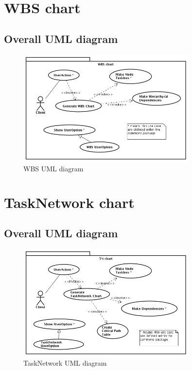 \chapter{WBS chart}
\section*{Overall UML diagram}
\begin{figure}[h!] \centering
\includegraphics[width=0.8\textwidth]{../Milestone2-UseCases/WBS/WBSChart.png}
\caption{WBS UML diagram}
\label{fig:WBSdiagram}
\end{figure}





\chapter{TaskNetwork chart}
\section*{Overall UML diagram}
\begin{figure}[h!] \centering
\includegraphics[width=0.8\textwidth]{../Milestone2-UseCases/TaskNetwork/img/TNChart.png}
\caption{TaskNetwork UML diagram}
\label{fig:TNdiagram}
\end{figure}



